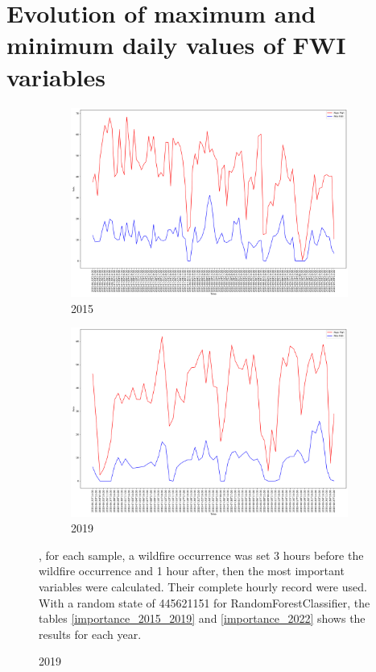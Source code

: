 \FloatBarrier

\section{Evolution of maximum and minimum daily values of FWI variables}
\begin{figure}[h]
	\centering
	\caption{Daily max and min FWI values}
	\begin{subfigure}{0.45\textwidth}
		\centering
		\includegraphics[width=\textwidth]{graphs/2015/byHour/FWI_maxMin.png}
		\caption{2015}
	\end{subfigure}
	\hfill
	\begin{subfigure}{0.45\textwidth}
		\centering
		\includegraphics[width=\textwidth]{graphs/2019/byHour/FWI_maxMin.png}
		\caption{2019}
	\end{subfigure}
	\hfillFirstly, for each sample, a wildfire occurrence was set 3 hours before the wildfire occurrence and 1 hour after, then the most important variables were calculated. Their complete hourly record were used. With a random state of 445621151 for RandomForestClassifier, the tables \ref{importance_2015_2019} and \ref{importance_2022} shows the results for each year.

\end{figure}
